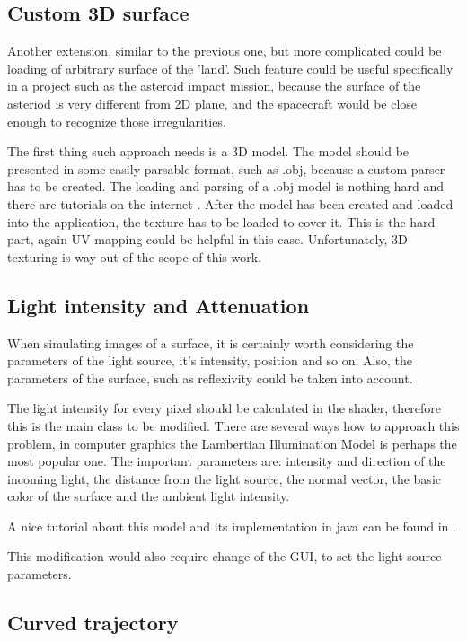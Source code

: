 \documentclass[english,12pt,a4paper,pdftex,elec,utf8]{aaltothesis}
\begin{document}
\subsection*{Custom 3D surface}

Another extension, similar to the previous one, but more complicated could be loading of arbitrary surface of the 'land'. Such feature could be useful specifically in a project such as the asteroid impact mission, because the surface of the asteriod is very different from 2D plane, and the spacecraft would be close enough to recognize those irregularities.

The first thing such approach needs is a 3D model. The model should be presented in some easily parsable format, such as .obj, because a custom parser has to be created. The loading and parsing of a .obj model is nothing hard and there are tutorials on the internet \cite{Load3DModel}. After the model has been created and loaded into the application, the texture has to be loaded to cover it. This is the hard part, again UV mapping\cite{UVmappingWiki} could be helpful in this case. Unfortunately, 3D texturing is way out of the scope of this work. 

\subsection*{Light intensity and Attenuation}

When simulating images of a surface, it is certainly worth considering the parameters of the light source, it's intensity, position and so on. Also, the parameters of the surface, such as reflexivity could be taken into account. 

The light intensity for every pixel should be calculated in the shader, therefore this is the main class to be modified. There are several ways how to approach this problem, in computer graphics the Lambertian Illumination Model is perhaps the most popular one. The important parameters are: intensity and direction of the incoming light, the distance from the light source, the normal vector, the basic color of the surface and the ambient light intensity.

A nice tutorial about this model and its implementation in java can be found in \cite{ShaderTut}.

This modification would also require change of the GUI, to set the light source parameters.

\subsection*{Curved trajectory}
\end{document}
